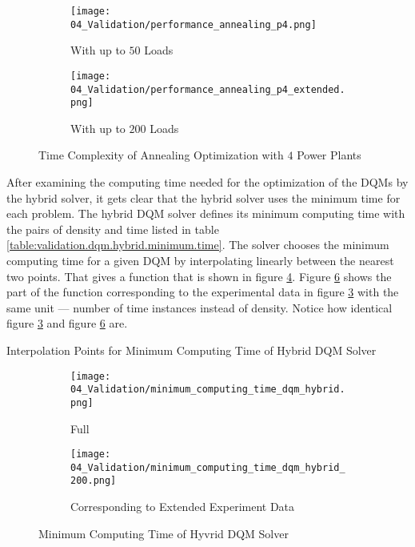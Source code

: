 \begin{figure}
  \begin{subfigure}[b]{0.5 \textwidth}
    \centering
    \texttt{[image: 04\_Validation/performance\_annealing\_p4.png]}
    \caption{With up to $50$ Loads}
    \label{figure:validation.annealing.performance}
  \end{subfigure}
  \begin{subfigure}[b]{0.5 \textwidth}
    \centering
    \texttt{[image: 04\_Validation/performance\_annealing\_p4\_extended.png]}
    \caption{With up to $200$ Loads}
    \label{figure:validation.annealing.performance.extended}
  \end{subfigure}
  \caption{Time Complexity of Annealing Optimization with $4$ Power Plants}
\end{figure}

After examining the computing time needed for the optimization of the DQMs by the hybrid solver, it gets clear that the hybrid solver uses the minimum time for each problem.
The hybrid DQM solver defines its minimum computing time with the pairs of density and time listed in table \ref{table:validation.dqm.hybrid.minimum.time}.
The solver chooses the minimum computing time for a given DQM by interpolating linearly between the nearest two points.
That gives a function that is shown in figure \ref{figure:validation.dqm.hybrid.minimum.time}.
Figure \ref{figure:validation.dqm.hybrid.minimum.time.200} shows the part of the function corresponding to the experimental data in figure \ref{figure:validation.annealing.performance.extended} with the same unit
--- number of time instances instead of density.
Notice how identical figure \ref{figure:validation.annealing.performance.extended} and figure \ref{figure:validation.dqm.hybrid.minimum.time.200} are.
\begin{table}[ht]
  \centering
  
  \caption{Interpolation Points for Minimum Computing Time of Hybrid DQM Solver}
  \label{table:validation.dqm.hybrid.minimum.time}
\end{table}
\begin{figure} [ht]
  \begin{subfigure}[b]{0.5 \textwidth}
    \centering
    \texttt{[image: 04\_Validation/minimum\_computing\_time\_dqm\_hybrid.png]}
    \caption{Full}
    \label{figure:validation.dqm.hybrid.minimum.time}
  \end{subfigure}
  \begin{subfigure}[b]{0.5 \textwidth}
    \centering
    \texttt{[image: 04\_Validation/minimum\_computing\_time\_dqm\_hybrid\_200.png]}
    \caption{Corresponding to Extended Experiment Data}
    \label{figure:validation.dqm.hybrid.minimum.time.200}
  \end{subfigure}
  \caption{Minimum Computing Time of Hyvrid DQM Solver}
\end{figure}


